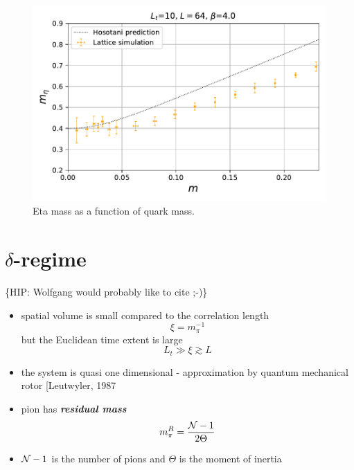 \documentclass[a4paper,11pt]{article}
\begin{document}
\begin{figure}
  \includegraphics[width=1\textwidth]{figs/Meta64x10FiniteT_Pt3}
  \caption{Eta mass as a function of quark mass.}
\end{figure}


\section{\texorpdfstring{$\delta$}{d}-regime}

\{HIP: Wolfgang would probably like to cite \cite{Bietenholz2010} ;-)\}

  \begin{itemize}
    \item spatial volume is small compared to the correlation
      length
      \[
        \xi = m_\pi^{-1}
      \]
      but the Euclidean time extent is large
      \[
        L_t\gg \xi \gtrsim L
      \]
    \item the system is quasi one dimensional - approximation by
      quantum mechanical rotor [Leutwyler, 1987\cite{Leutwyler1987}
    \item pion has \textbf{\textit{residual mass}}
      \[
        m_\pi^R = \frac{{\cal N} - 1}{2\Theta}
      \]
    \item ${\cal N} - 1$ is the number of pions and $\Theta$ is the moment of
      inertia
  \end{itemize}
\end{document}
